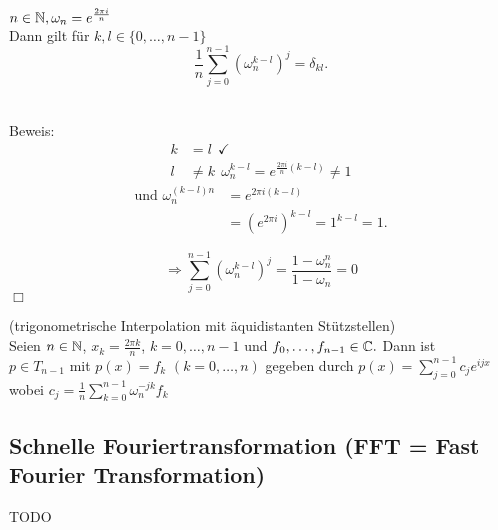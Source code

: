 \begin{Lemma}
$n \in \mathbb N, \omega_n = e^{\frac{2 \pi i}{n}} $ \\
Dann gilt für $k,l \in \{0, \dots, n-1\}$ \\
\[ \frac{1}{n} \sum_{j=0}^{n-1} (\omega_n^{k-l})^j = \delta_{kl}. \] \\
\end{Lemma}

Beweis:
\begin{align*}
k&= l~~ \checkmark \\
l &\neq k ~~ \omega_n^{k-l} = e^{\frac{2 \pi i}{n}(k-l)} \neq 1
\end{align*}
\begin{align*}
\text{und } \omega_n^{(k-l)n} &= e^{2 \pi i (k-l)} \\
&= (e^{2 \pi i})^{k-l} = 1^{k-l} = 1.
\end{align*}

\[ \Rightarrow \sum_{j=0}^{n-1} (\omega_n^{k-l})^j =
\frac{1-\omega_n^n}{1-\omega_n} = 0 \]   \hfill $\Box$

\begin{Satz} (trigonometrische Interpolation mit äquidistanten
Stützstellen) \\
Seien $n \in \mathbb N$, $x_k = \frac{2 \pi k}{n}$, $k = 0, \dots, n-1$
und $f_0, \dots, f_{n-1} \in \mathbb C.$ Dann ist \\
$p \in T_{n-1}$ mit $p(x) = f_k$ $(k=0,\dots, n)$
gegeben durch $p(x) = \sum_{j=0}^{n-1} c_j e^{ijx}$ \\
wobei $c_j = \frac{1}{n} \sum_{k=0}^{n-1} \omega_n^{-jk} f_k$

\end{Satz}

\subsection{Schnelle Fouriertransformation (FFT = Fast Fourier Transformation)}
TODO
